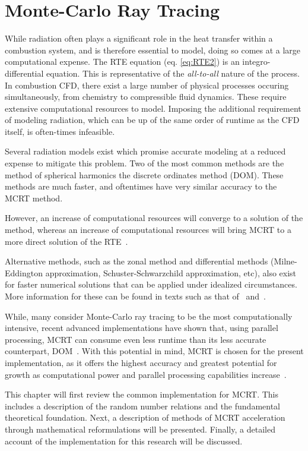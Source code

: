 \addchapheadtotoc
\chapter{Monte-Carlo Ray Tracing}\label{chapter:Modeling}
While radiation often plays a significant role in the heat transfer within a combustion system, and is therefore essential to model, doing so comes at a large computational expense. 
The RTE equation (eq. \ref{eq:RTE2}) is an integro-differential equation. This is representative of the \textit{all-to-all} nature of the process. In combustion CFD, there exist a large number of physical processes occuring simultaneously, from chemistry to compressible fluid dynamics. 
These require extensive computational resources to model. Imposing the additional requirement of modeling radiation, which can be up of the same order of runtime as the CFD itself, is often-times infeasible. 

Several radiation models exist which promise accurate modeling at a reduced expense to mitigate this problem. Two of the most common methods are the method of spherical harmonics the discrete ordinates method (DOM).
These methods are much faster, and oftentimes have very similar accuracy to the MCRT method. 

However, an increase of computational resources will converge to a solution of the method, whereas an increase of computational resources will bring MCRT to a more direct solution of the RTE~\cite{Leccese2018ConvectiveChambers}.

Alternative methods, such as the zonal method and differential methods (Milne-Eddington approximation, Schuster-Schwarzchild approximation, etc), also exist for faster numerical solutions that can be applied under idealized circumstances.
More information for these can be found in texts such as that of~\citet{Modest2013RadiativeTransfer} and~\citet{Howell2010ThermalTransfer}.

While, many consider Monte-Carlo ray tracing to be the most computationally intensive, recent advanced implementations have shown that, using parallel processing, MCRT can consume even less runtime than its less accurate counterpart, DOM~\cite{Humphrey2016RadiativeRefinement}.
With this potential in mind, MCRT is chosen for the present implementation, as it offers the highest accuracy and greatest potential for growth as computational power and parallel processing capabilities increase~\cite{Liu2020TheFlames,Howell2010ThermalTransfer}.

This chapter will first review the common implementation for MCRT. This includes a description of the random number relations and the fundamental theoretical foundation.
Next, a description of methods of MCRT acceleration through mathematical reformulations will be presented.
Finally, a detailed account of the implementation for this research will be discussed.

